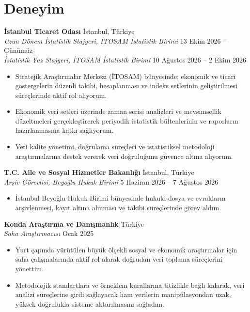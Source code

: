 \documentclass[10pt,a4paper]{extarticle}
\begin{document}
\section{Deneyim}
\textbf{İstanbul Ticaret Odası} \hfill İstanbul, Türkiye\\
\textit{Uzun Dönem İstatistik Stajyeri, İTOSAM İstatistik Birimi} \hfill 13 Ekim 2026 -- Günümüz\\
\textit{İstatistik Yaz Stajyeri, İTOSAM İstatistik Birimi} \hfill 10 Ağustos 2026 -- 2 Ekim 2026
\begin{itemize}[leftmargin=*,noitemsep,topsep=2pt]
    \item Stratejik Araştırmalar Merkezi (İTOSAM) bünyesinde; ekonomik ve ticari göstergelerin düzenli takibi, hesaplanması ve indeks setlerinin geliştirilmesi süreçlerinde aktif rol alıyorum.
    \item Ekonomik veri setleri üzerinde zaman serisi analizleri ve mevsimsellik düzeltmeleri gerçekleştirerek periyodik istatistik bültenlerinin ve raporların hazırlanmasına katkı sağlıyorum.
    \item Veri kalite yönetimi, doğrulama süreçleri ve istatistiksel metodoloji araştırmalarına destek vererek veri doğruluğunu güvence altına alıyorum.
\end{itemize}
\textbf{T.C. Aile ve Sosyal Hizmetler Bakanlığı} \hfill İstanbul, Türkiye\\
\textit{Arşiv Görevlisi, Beyoğlu Hukuk Birimi} \hfill 5 Haziran 2026 -- 7 Ağustos 2026
\begin{itemize}[leftmargin=*,noitemsep,topsep=2pt]
    \item İstanbul Beyoğlu Hukuk Birimi bünyesinde hukuki dosya ve evrakların arşivlenmesi, kayıt altına alınması ve takibi süreçlerinde görev aldım.
\end{itemize}
\textbf{Konda Araştırma ve Danışmanlık} \hfill Türkiye\\
\textit{Saha Araştırmacısı} \hfill Ocak 2025
\begin{itemize}[leftmargin=*,noitemsep,topsep=2pt]
    \item Yurt çapında yürütülen büyük ölçekli sosyal ve ekonomik araştırmalar için saha çalışmalarında aktif rol alarak doğrudan veri toplama süreçlerini yönettim.
    \item Metodolojik standartlara ve örneklem kurallarına titizlikle bağlı kalarak, veri analizi süreçlerine girdi sağlayacak ham verilerin manipülasyondan uzak, yüksek doğrulukla sisteme aktarılmasını sağladım.
\end{itemize}
\end{document}
